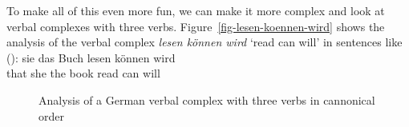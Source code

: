 To make all of this even more fun, we can make it more complex and look at verbal complexes with
three verbs. Figure~\vref{fig-lesen-koennen-wird} shows the analysis of the verbal complex \emph{lesen können wird} `read
can will' in sentences like ():
\ea
\label{ex-lesen-koennen-wird}
\gll [dass] sie das Buch lesen können wird\\
     \spacebr{}that she the book read can will\\
\z



\begin{figure}
\caption{\label{fig-lesen-koennen-wird}Analysis of a German verbal complex with three verbs in cannonical order}
\end{figure}


